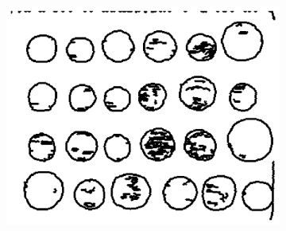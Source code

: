 \documentclass[11pt]{article}
\begin{document}
\begin{figure}[H]
\begin{subfigure}{.33\textwidth}
        \centering
        \includegraphics[width=\linewidth]{figs/q1c_dilated_inverted_edges.png}
        \caption{}
    \end{subfigure}%


\end{figure}
\end{document}
